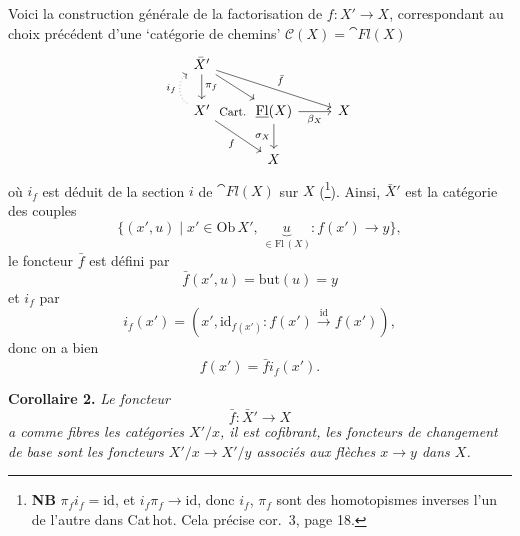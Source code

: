 Voici la construction générale de la factorisation de $f : X' \longrightarrow X$, correspondant au choix précédent d'une `catégorie de chemins' $\mathcal{C}(X) = \cat{Fl}(X)$
\[
\begin{tikzcd}
\bar{X}' \arrow[d, "\pi_f"] \arrow[rd] \arrow[rrd, "\bar{f}"] & & \\
X' \arrow[u, dotted, bend left=60, "i_f"] \arrow[rd, "f"'] \arrow[r, phantom, "\text{\footnotesize Cart.}"] & \cat{Fl}(X) \arrow[r, "\beta_X"'] \arrow[d, "\sigma_X"'] & X \\
& X &
\end{tikzcd}
\]
où $i_f$ est déduit de la section $i$ de $\cat{Fl}(X)$ sur $X$ (\footnote[9]{\textbf{NB} $\pi_f i_f = \mathrm{id}$, et $i_f\pi_f \longrightarrow \mathrm{id}$, donc $i_f$, $\pi_f$ sont des homotopismes inverses l'un de l'autre dans Cat\,hot. Cela précise cor.~3, page 18.}). Ainsi, $\bar{X}'$ est la catégorie des couples
\[
\{(x',u) \mid x' \in \mathrm{Ob}\,X',\ \underbrace{u}_{\in\mathrm{Fl}\,(X)} : f(x') \longrightarrow y\},
\]
le foncteur $\bar{f}$ est défini par
\[
\bar{f}(x',u) = \mathrm{but}(u) = y
\]
et $i_f$ par
\[
i_f(x') = (x', \mathrm{id}_{f(x')} : f(x') \xrightarrow{\mathrm{id}} f(x')),
\]
donc on a bien
\[
f(x') = \bar{f} i_f(x').
\]

\textbf{Corollaire 2.} \textit{Le foncteur}
\[
\bar{f} : \bar{X}' \longrightarrow X
\]
\textit{a comme fibres les catégories $X'/x$, il est cofibrant, les foncteurs de changement de base sont les foncteurs $X'/x \longrightarrow X'/y$ associés aux flèches $x \longrightarrow y$ dans $X$.}

